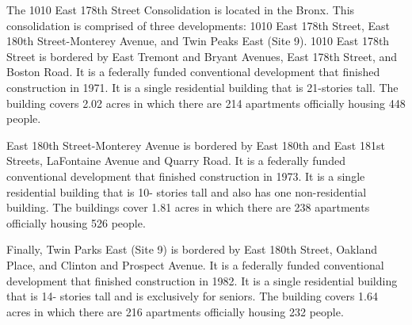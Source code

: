 The 1010 East 178th Street Consolidation is located in the Bronx. This consolidation is comprised of three developments: 1010 East 178th Street, East 180th Street-Monterey Avenue, and Twin Peaks East (Site 9). 1010 East 178th Street is bordered by East Tremont and Bryant Avenues, East 178th Street, and Boston Road. It is a federally funded conventional development that finished construction in 1971. It is a single residential building that is 21-stories tall. The building covers 2.02 acres in which there are 214 apartments officially housing 448 people.  \par \vspace{.7\baselineskip}East 180th Street-Monterey Avenue is bordered by East 180th and East 181st Streets, LaFontaine Avenue and Quarry Road. It is a federally funded conventional development that finished construction in 1973. It is a single residential building that is 10- stories tall and also has one non-residential building. The buildings cover 1.81 acres in which there are 238 apartments officially housing 526 people.  \par \vspace{.7\baselineskip}Finally, Twin Parks East (Site 9) is bordered by East 180th Street, Oakland Place, and Clinton and Prospect Avenue. It is a federally funded conventional development that finished construction in 1982. It is a single residential building that is 14- stories tall and is exclusively for seniors. The building covers 1.64 acres in which there are 216 apartments officially housing 232 people.